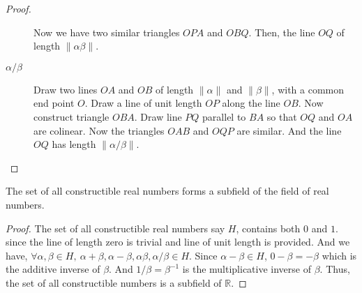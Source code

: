 \begin{proof}
\begin{description}
		Now we have two similar triangles $OPA$ and $OBQ$.
		Then, the line $OQ$ of length $\| \alpha \beta \|$.
\begin{center}
\end{center}
	\item[$\alpha/\beta$] Draw two lines $OA$ and $OB$ of length $\| \alpha \|$ and $\| \beta \|$, with a common end point $O$.
		Draw a line of unit length $OP$ along the line $OB$.
		Now construct triangle $OBA$.
		Draw line $PQ$ parallel to $BA$ so that $OQ$ and $OA$ are colinear.
		Now the triangles $OAB$ and $OQP$ are similar.
		And the line $OQ$ has length $\| \alpha/\beta \|$.
\begin{center}
\end{center}
\end{description}
\end{proof}

\begin{corollary}
	The set of all constructible real numbers forms a subfield of the field of real numbers.
\end{corollary}
\begin{proof}
	The set of all constructible real numbers say $H$, contains both $0$ and $1$.
	since the line of length zero is trivial and line of unit length is provided.
	And we have, $\forall \alpha,\beta \in H,\ \alpha+\beta,\alpha-\beta,\alpha\beta,\alpha/\beta \in H$.
	Since $\alpha - \beta \in H$, $0-\beta = -\beta$ which is the additive inverse of $\beta$.
	And $1/\beta = \beta^{-1}$ is the multiplicative inverse of $\beta$.
	Thus, the set of all constructible numbers is a subfield of $\mathbb{R}$.
\end{proof}


